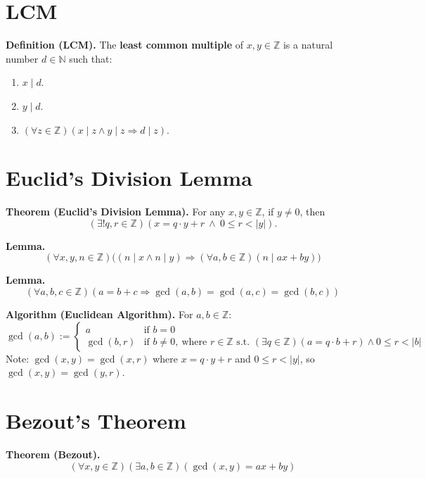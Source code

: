 \documentclass[12pt]{article}
\newcommand{\defn}[1]{\textbf{#1}}
\theoremstyle{proofstyle}
\begin{document}
\section*{LCM}

\textbf{Definition (LCM).} The \defn{least common multiple} of $x, y \in \mathbb{Z}$
is a natural number $d \in \mathbb{N}$ such that:
\begin{enumerate}[label=\arabic*., itemsep=0.5em]
    \item $x \mid d$.
    \item $y \mid d$.
    \item $(\forall z \in \mathbb{Z})(x \mid z \wedge y \mid z \Rightarrow d \mid z)$.
\end{enumerate}

\section*{Euclid's Division Lemma}

\textbf{Theorem (Euclid's Division Lemma).} For any $x, y \in \mathbb{Z}$,
if $y \neq 0$, then
\[
    (\exists! q, r \in \mathbb{Z})(x = q \cdot y + r \ \wedge \ 0 \leq r < |y|).
\]

\textbf{Lemma.}
\[
    (\forall x, y, n \in \mathbb{Z})\Big((n \mid x \wedge n \mid y) \Rightarrow
    (\forall a, b \in \mathbb{Z})(n \mid ax + by)\Big)
\]

\textbf{Lemma.}
\[
    (\forall a, b, c \in \mathbb{Z})(a = b + c \Rightarrow \gcd(a,b) = \gcd(a,c) = \gcd(b,c))
\]

\textbf{Algorithm (Euclidean Algorithm).} For $a, b \in \mathbb{Z}$:
\[
    \gcd(a, b) :=
    \begin{cases}
        a           & \text{if } b = 0 \\
        \gcd(b, r)  & \text{if } b \neq 0,\ \text{where } r \in \mathbb{Z}
                      \text{ s.t. } (\exists q \in \mathbb{Z})(a = q \cdot b + r)
                      \wedge 0 \leq r < |b|
    \end{cases}
\]
Note: $\gcd(x, y) = \gcd(x, r)$ where $x = q \cdot y + r$ and $0 \leq r < |y|$,
so $\gcd(x,y) = \gcd(y, r)$.

\section*{Bezout's Theorem}

\textbf{Theorem (Bezout).}
\[
    (\forall x, y \in \mathbb{Z})(\exists a, b \in \mathbb{Z})(\gcd(x,y) = ax + by)
\]
\end{document}
